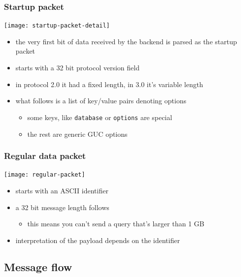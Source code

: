 \documentclass{beamer}
\begin{document}
\begin{frame}
  \frametitle{Startup packet}

  \begin{center}
    \texttt{[image: startup-packet-detail]}
  \end{center}

  \begin{itemize}
  \item the very first bit of data received by the backend is parsed as the
    startup packet
  \item starts with a 32 bit \alert{protocol version} field
  \item in protocol 2.0 it had a fixed length, in 3.0 it's variable length
  \item what follows is a list of key/value pairs denoting options
    \begin{itemize}
    \item some keys, like \texttt{database} or \texttt{options} are special
    \item the rest are generic GUC options
    \end{itemize}
  \end{itemize}
\end{frame}

\begin{frame}
  \frametitle{Regular data packet}

  \begin{center}
    \texttt{[image: regular-packet]}
  \end{center}

  \begin{itemize}
  \item starts with an ASCII \alert{identifier}
  \item a 32 bit message length follows
    \begin{itemize}
    \item this means you can't send a query that's larger than 1 GB
    \end{itemize}
  \item interpretation of the payload depends on the identifier
  \end{itemize}
\end{frame}

\subsection{Message flow}
\end{document}
